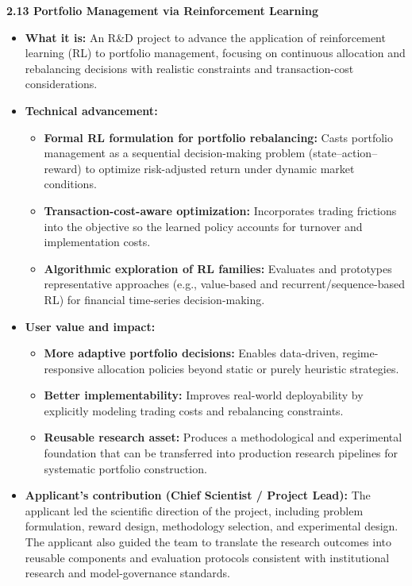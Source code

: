 \documentclass[11pt]{article}
\newcommand{\CVSubsection}[1]{\textbf{#1}\par}
\newenvironment{tightitemize}{%
  \begin{itemize}[leftmargin=*,nosep,topsep=2pt]
}{\end{itemize}}
\begin{document}

\CVSubsection{2.13 Portfolio Management via Reinforcement Learning}

\begin{tightitemize}
  \item \textbf{What it is:} An R\&D project to advance the application of reinforcement learning (RL) to portfolio management, focusing on continuous allocation and rebalancing decisions with realistic constraints and transaction-cost considerations.
  \item \textbf{Technical advancement:}
  \begin{tightitemize}
    \item \textbf{Formal RL formulation for portfolio rebalancing:} Casts portfolio management as a sequential decision-making problem (state--action--reward) to optimize risk-adjusted return under dynamic market conditions.
    \item \textbf{Transaction-cost-aware optimization:} Incorporates trading frictions into the objective so the learned policy accounts for turnover and implementation costs.
    \item \textbf{Algorithmic exploration of RL families:} Evaluates and prototypes representative approaches (e.g., value-based and recurrent/sequence-based RL) for financial time-series decision-making.
  \end{tightitemize}
  \item \textbf{User value and impact:}
  \begin{tightitemize}
    \item \textbf{More adaptive portfolio decisions:} Enables data-driven, regime-responsive allocation policies beyond static or purely heuristic strategies.
    \item \textbf{Better implementability:} Improves real-world deployability by explicitly modeling trading costs and rebalancing constraints.
    \item \textbf{Reusable research asset:} Produces a methodological and experimental foundation that can be transferred into production research pipelines for systematic portfolio construction.
  \end{tightitemize}
  \item \textbf{Applicant’s contribution (Chief Scientist / Project Lead):} The applicant led the scientific direction of the project, including problem formulation, reward design, methodology selection, and experimental design. The applicant also guided the team to translate the research outcomes into reusable components and evaluation protocols consistent with institutional research and model-governance standards.

\end{tightitemize}
\end{document}
